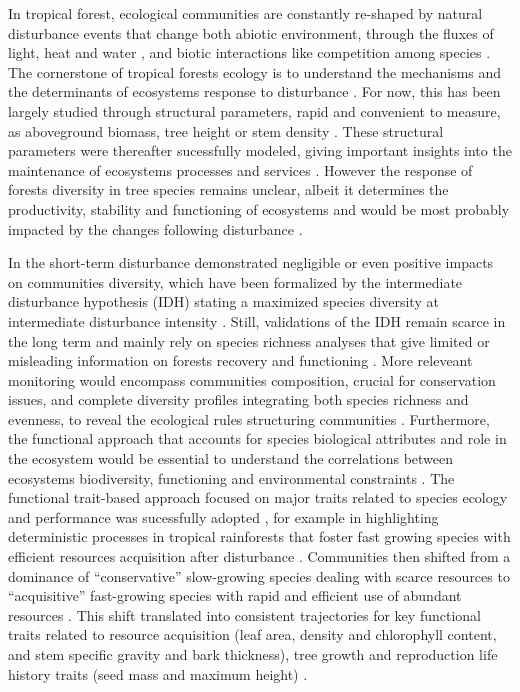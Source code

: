 \documentclass[fleqn,10pt]{ArtEcoFoG} %
\theoremstyle{definition}
\theoremstyle{definition}
\theoremstyle{definition}
\theoremstyle{remark}
\begin{document}
In tropical forest, ecological communities are constantly re-shaped by
natural disturbance events that change both abiotic environment, through
the fluxes of light, heat and water \citep{Goulamoussene2017}, and
biotic interactions like competition among species \citep{Herault2018}.
The cornerstone of tropical forests ecology is to understand the
mechanisms and the determinants of ecosystems response to disturbance
\citep{White2001, Chazdon2003a}. For now, this has been largely studied
through structural parameters, rapid and convenient to measure, as
aboveground biomass, tree height or stem density
\citep{Piponiot2016, Rutishauser2016}. These structural parameters were
thereafter sucessfully modeled, giving important insights into the
maintenance of ecosystems processes and services
\citep{Denslow2000, Blanc2009}. However the response of forests
diversity in tree species remains unclear, albeit it determines the
productivity, stability and functioning of ecosystems
\citep[\citet{Liang2016}]{Tilman2014} and would be most probably
impacted by the changes following disturbance \citep{Baraloto2012a}.

In the short-term disturbance demonstrated negligible or even positive
impacts on communities diversity, which have been formalized by the
intermediate disturbance hypothesis (IDH) stating a maximized species
diversity at intermediate disturbance intensity
\citep{Molino2001, Kariuki2006a, Berry2008a}. Still, validations of the
IDH remain scarce in the long term and mainly rely on species richness
analyses that give limited or misleading information on forests recovery
and functioning \citep{Martin2015, Chaudhary2016}. More releveant
monitoring would encompass communities composition, crucial for
conservation issues, and complete diversity profiles integrating both
species richness and evenness, to reveal the ecological rules
structuring communities \citep{Magurran1988, Lavorel2002, Bellwood2006}.
Furthermore, the functional approach that accounts for species
biological attributes and role in the ecosystem would be essential to
understand the correlations between ecosystems biodiversity, functioning
and environmental constraints
\citep{Violle2007b, Moretti2009, Baraloto2012a, Scheiter2013}. The
functional trait-based approach focused on major traits related to
species ecology and performance was sucessfully adopted
\citep{Diaz2005, Villeger2008a}, for example in highlighting
deterministic processes in tropical rainforests that foster fast growing
species with efficient resources acquisition after disturbance
\citep{Molino2001, Haddad2008, Ruger2009}. Communities then shifted from
a dominance of ``conservative'' slow-growing species dealing with scarce
resources to ``acquisitive'' fast-growing species with rapid and
efficient use of abundant resources
\citep{TerSteege2001, Reich2014, Herault2011}. This shift translated
into consistent trajectories for key functional traits related to
resource acquisition (leaf area, density and chlorophyll content, and
stem specific gravity and bark thickness), tree growth and reproduction
life history traits (seed mass and maximum height)
\citep{Wright2004, TerSteege2006, Westoby2006a, Chave2009b}.
\end{document}
